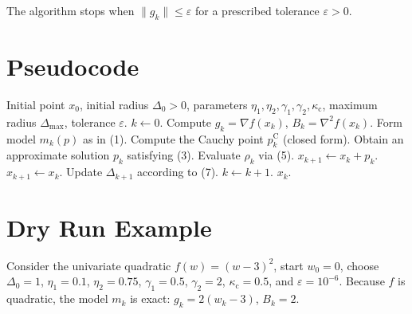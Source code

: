 \documentclass[11pt]{article}
\begin{document}
The algorithm stops when $\|g_{k}\|\le\varepsilon$ for a prescribed tolerance $\varepsilon>0$.

\section*{Pseudocode}
\begin{algorithm}[H]
\caption{TR‑A: Trust Region with Approximate Subproblem}
\begin{algorithmic}[1]
\REQUIRE Initial point $x_{0}$, initial radius $\Delta_{0}>0$, 
parameters $\eta_{1},\eta_{2},\gamma_{1},\gamma_{2},\kappa_{\mathrm{c}}$, 
maximum radius $\Delta_{\max}$, tolerance $\varepsilon$.
\STATE $k\gets0$.
    \STATE Compute $g_{k}=\nabla f(x_{k})$, $B_{k}=\nabla^{2}f(x_{k})$.
    \STATE Form model $m_{k}(p)$ as in (1).
    \STATE Compute the Cauchy point $p^{\mathrm{C}}_{k}$ (closed form).
    \STATE Obtain an approximate solution $p_{k}$ satisfying (3).
    \STATE Evaluate $\rho_{k}$ via (5).
        \STATE $x_{k+1}\gets x_{k}+p_{k}$.
    \ELSE
        \STATE $x_{k+1}\gets x_{k}$.
    \ENDIF
    \STATE Update $\Delta_{k+1}$ according to (7).
    \STATE $k\gets k+1$.
\ENDWHILE
\RETURN $x_{k}$.
\end{algorithmic}
\end{algorithm}

\section*{Dry Run Example}
Consider the univariate quadratic $f(w)=(w-3)^{2}$, start $w_{0}=0$, choose
$\Delta_{0}=1$, $\eta_{1}=0.1$, $\eta_{2}=0.75$, $\gamma_{1}=0.5$, $\gamma_{2}=2$, $\kappa_{\mathrm{c}}=0.5$, and $\varepsilon=10^{-6}$.
Because $f$ is quadratic, the model $m_{k}$ is exact: $g_{k}=2(w_{k}-3)$, $B_{k}=2$.
\end{document}
